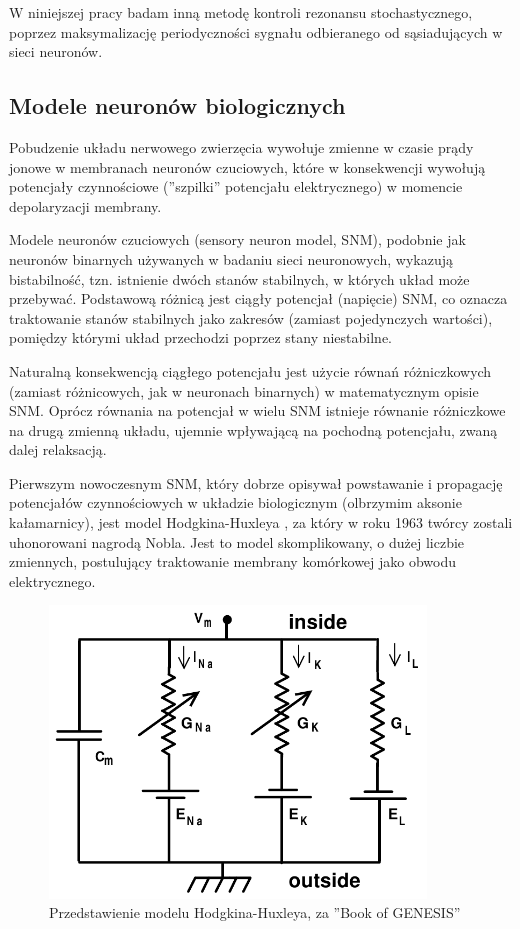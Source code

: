   W niniejszej pracy badam inną metodę kontroli rezonansu stochastycznego, poprzez maksymalizację periodyczności sygnału odbieranego od sąsiadujących w sieci neuronów.
  
  \subsection{Modele neuronów biologicznych}
  
  Pobudzenie układu nerwowego zwierzęcia wywołuje zmienne w czasie prądy jonowe w membranach neuronów czuciowych, które w konsekwencji wywołują potencjały czynnościowe (''szpilki'' potencjału elektrycznego) w momencie depolaryzacji membrany.
  
  Modele neuronów czuciowych (sensory neuron model, SNM), podobnie jak neuronów binarnych używanych w badaniu sieci neuronowych, wykazują bistabilność, tzn. istnienie dwóch stanów stabilnych, w których układ może przebywać. Podstawową różnicą jest ciągły potencjał (napięcie) SNM, co oznacza traktowanie stanów stabilnych jako zakresów (zamiast pojedynczych wartości), pomiędzy którymi układ przechodzi poprzez stany niestabilne. 
  
  Naturalną konsekwencją ciągłego potencjału jest użycie równań różniczkowych (zamiast różnicowych, jak w neuronach binarnych) w matematycznym opisie SNM. Oprócz równania na potencjał w wielu SNM istnieje równanie różniczkowe na drugą zmienną układu, ujemnie wpływającą na pochodną potencjału, zwaną dalej relaksacją.
  
  Pierwszym nowoczesnym SNM, który dobrze opisywał powstawanie i propagację potencjałów czynnościowych w układzie biologicznym (olbrzymim aksonie kałamarnicy), jest model Hodgkina-Huxleya \cite{hodgkin}, za który w roku 1963 twórcy zostali uhonorowani nagrodą Nobla. Jest to model skomplikowany, o dużej liczbie zmiennych, postulujący traktowanie membrany komórkowej jako obwodu elektrycznego.

  \begin{figure}
    \includegraphics[width=100mm]{images/hh.png}
    \caption{Przedstawienie modelu Hodgkina-Huxleya, za ''Book of GENESIS'' \cite{genesis}}
    \label{fig:graphics:genesis}
  \end{figure}

